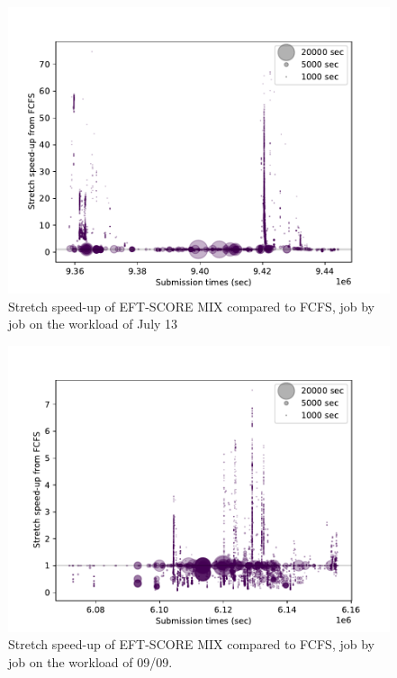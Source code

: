 \documentclass[conference,10pt]{IEEEtran}
\begin{document}
\begin{figure}\centering\includegraphics[width=1\linewidth]{../MBSS/plot/Stretch_times/Stretch_times_FCFS_EFT-SCORE-MIX_2022-07-13->2022-07-13_V10000_450_128_32_256_4_1024.pdf}\caption{Stretch speed-up of EFT-SCORE MIX compared to FCFS, job by job on the workload of July 13}\end{figure}
\begin{figure}\centering\includegraphics[width=1\linewidth]{../MBSS/plot/Stretch_times/Stretch_times_FCFS_EFT-SCORE-MIX_2022-09-09->2022-09-09_V10000_450_128_32_256_4_1024.pdf}\caption{Stretch speed-up of EFT-SCORE MIX compared to FCFS, job by job on the workload of 09/09.}\end{figure}
\end{document}
